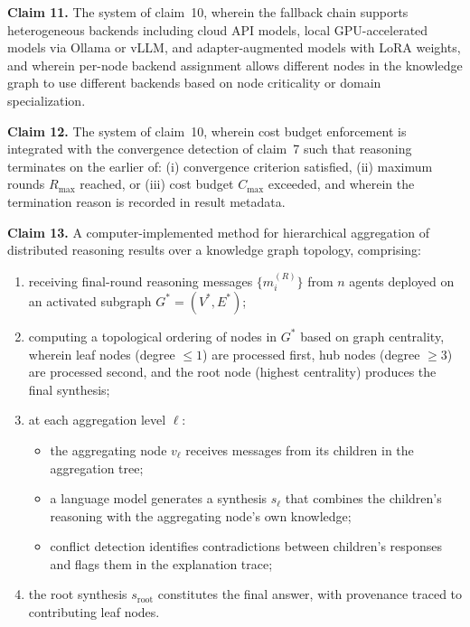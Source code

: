 \documentclass[a4paper,12pt]{article}
\begin{document}
\bigskip

\noindent\textbf{Claim 11.} The system of claim~10, wherein the fallback chain supports heterogeneous backends including cloud API models, local GPU-accelerated models via Ollama or vLLM, and adapter-augmented models with LoRA weights, and wherein per-node backend assignment allows different nodes in the knowledge graph to use different backends based on node criticality or domain specialization.

\bigskip

\noindent\textbf{Claim 12.} The system of claim~10, wherein cost budget enforcement is integrated with the convergence detection of claim~7 such that reasoning terminates on the earlier of: (i) convergence criterion satisfied, (ii) maximum rounds $R_{\max}$ reached, or (iii) cost budget $C_{\max}$ exceeded, and wherein the termination reason is recorded in result metadata.

\bigskip


\noindent\textbf{Claim 13.} A computer-implemented method for hierarchical aggregation of distributed reasoning results over a knowledge graph topology, comprising:

\begin{enumerate}[label=(\alph*),nosep,leftmargin=2em]
\item receiving final-round reasoning messages $\{m_i^{(R)}\}$ from $n$ agents deployed on an activated subgraph $G^* = (V^*, E^*)$;
\item computing a topological ordering of nodes in $G^*$ based on graph centrality, wherein leaf nodes (degree $\leq 1$) are processed first, hub nodes (degree $\geq 3$) are processed second, and the root node (highest centrality) produces the final synthesis;
\item at each aggregation level $\ell$:
  \begin{itemize}[nosep,leftmargin=1.5em]
  \item the aggregating node $v_\ell$ receives messages from its children in the aggregation tree;
  \item a language model generates a synthesis $s_\ell$ that combines the children's reasoning with the aggregating node's own knowledge;
  \item conflict detection identifies contradictions between children's responses and flags them in the explanation trace;
  \end{itemize}
\item the root synthesis $s_{\mathrm{root}}$ constitutes the final answer, with provenance traced to contributing leaf nodes.
\end{enumerate}
\end{document}
